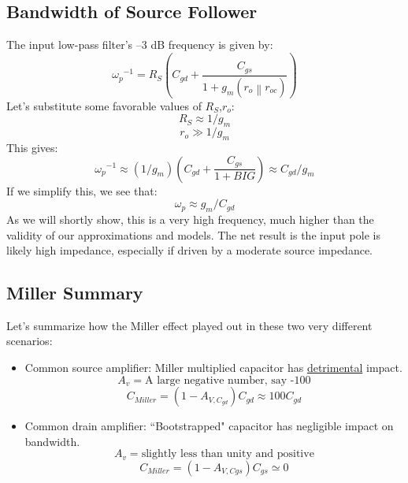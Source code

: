 
 
\subsection{Bandwidth of Source Follower}

The input low-pass filter’s –3 dB frequency is given by:
%
\begin{equation} 
	{\omega _p}^{ - 1} = {R_S}\left( {{C_{gd}} + \frac{{{C_{gs}}}}{{1 + {g_m}(\left. {{r_o}} \right\|{r_{oc}})}}} \right)
\end{equation}
%
Let's substitute some favorable values of $R_S$,$r_o$:
\begin{equation} 
	{R_S} \approx 1/{g_m} 
\end{equation}
\begin{equation} 
	{r_o} \gg 1/{g_m} 
\end{equation}
This gives:
\begin{equation} 
	{\omega _p}^{ - 1} \approx \left( {1/{g_m}} \right)\left( {{C_{gd}} + \frac{{{C_{gs}}}}{{1 + BIG}}} \right) \approx {C_{gd}}/{g_m} 
\end{equation}
If we simplify this, we see that:
\begin{equation}
	{\omega _p} \approx {g_m}/{C_{gd}}
\end{equation}
%
As we will shortly show, this is a very high frequency, much higher than the validity of our approximations and models.  The net result is the input pole is likely high impedance, especially if driven by a moderate source impedance.
 


\subsection{Miller Summary}


Let's summarize how the Miller effect played out in these two very different scenarios:

\begin{itemize}

\item Common source amplifier:  Miller multiplied capacitor has \underline{detrimental} impact.
%
\[
	A_v = \text{A large negative number, say -100} 
\]
%
\[	
	{C_{Miller}} = (1 - {A_{V,{C_{gd}}}}){C_{gd}} \approx 100{C_{gd}}
\]
%
\item Common drain amplifier:  ``Bootstrapped" capacitor has negligible impact on bandwidth.
%
\[
	A_v = \text{slightly less than unity and positive} 
\]
%
\[
	{C_{Miller}} = (1 - {A_{V,Cgs}}){C_{gs}} \simeq 0
\]

\end{itemize}
 

